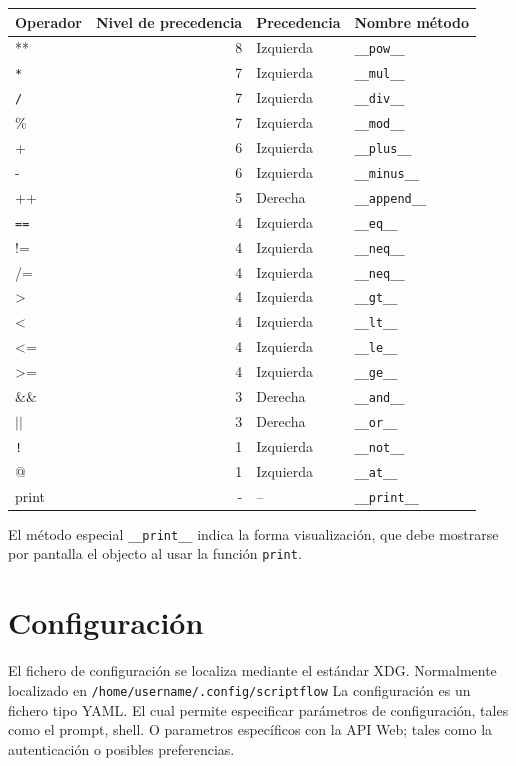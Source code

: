 \documentclass[11pt]{article}
\begin{document}
\begin{center}
\begin{tabular}{lrll}
Operador & Nivel de precedencia & Precedencia & Nombre método\\
\hline
** & 8 & Izquierda & \texttt{\_\_pow\_\_}\\
\texttt{*} & 7 & Izquierda & \texttt{\_\_mul\_\_}\\
\texttt{/} & 7 & Izquierda & \texttt{\_\_div\_\_}\\
\% & 7 & Izquierda & \texttt{\_\_mod\_\_}\\
+ & 6 & Izquierda & \texttt{\_\_plus\_\_}\\
- & 6 & Izquierda & \texttt{\_\_minus\_\_}\\
++ & 5 & Derecha & \texttt{\_\_append\_\_}\\
\texttt{==} & 4 & Izquierda & \texttt{\_\_eq\_\_}\\
!= & 4 & Izquierda & \texttt{\_\_neq\_\_}\\
/= & 4 & Izquierda & \texttt{\_\_neq\_\_}\\
> & 4 & Izquierda & \texttt{\_\_gt\_\_}\\
< & 4 & Izquierda & \texttt{\_\_lt\_\_}\\
<= & 4 & Izquierda & \texttt{\_\_le\_\_}\\
>= & 4 & Izquierda & \texttt{\_\_ge\_\_}\\
\&\& & 3 & Derecha & \texttt{\_\_and\_\_}\\
\(\vert{} \vert{}\) & 3 & Derecha & \texttt{\_\_or\_\_}\\
\texttt{!} & 1 & Izquierda & \texttt{\_\_not\_\_}\\
@ & 1 & Izquierda & \texttt{\_\_at\_\_}\\
print & - & -- & \texttt{\_\_print\_\_}\\
\end{tabular}
\end{center}


El método especial \texttt{\_\_print\_\_} indica la forma visualización, que debe mostrarse por pantalla el objecto al usar la función \texttt{print}.


\section{Configuración}
\label{sec:orgb00be54}

\label{org68f320f}
El fichero de configuración se localiza mediante el
estándar XDG. Normalmente localizado en \texttt{/home/username/.config/scriptflow}
La configuración es un fichero tipo YAML. El cual permite especificar
parámetros de configuración, tales como el prompt, shell. O parametros
específicos con la API Web; tales como la autenticación o posibles
preferencias.
\end{document}
